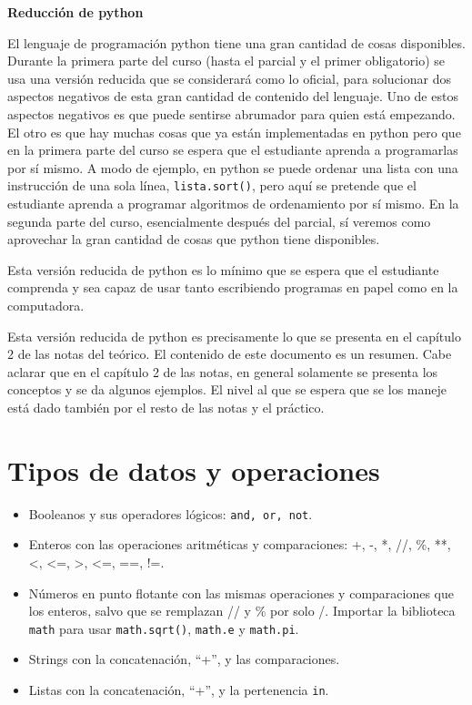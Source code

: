 \documentclass[a4paper, 12pt]{article}
\theoremstyle{definition}
\begin{document}
\centerline{\Huge\bf Reducción de python}

\vspace{2em}

El lenguaje de programación python tiene una gran cantidad de cosas disponibles. Durante la primera parte del curso (hasta el parcial y el primer obligatorio) se usa una versión reducida que se considerará como lo oficial, para solucionar dos aspectos negativos de esta gran cantidad de contenido del lenguaje. Uno de estos aspectos negativos es que puede sentirse abrumador para quien está empezando. El otro es que hay muchas cosas que ya están implementadas en python pero que en la primera parte del curso se espera que el estudiante aprenda a programarlas por sí mismo. A modo de ejemplo, en python se puede ordenar una lista con una instrucción de una sola línea, {\tt lista.sort()}, pero aquí se pretende que el estudiante aprenda a programar algoritmos de ordenamiento por sí mismo. En la segunda parte del curso, esencialmente después del parcial, sí veremos como aprovechar la gran cantidad de cosas que python tiene disponibles.

Esta versión reducida de python es lo mínimo que se espera que el estudiante comprenda y sea capaz de usar tanto escribiendo programas en papel como en la computadora.

Esta versión reducida de python es precisamente lo que se presenta en el capítulo 2 de las notas del teórico. El contenido de este documento es un resumen. Cabe aclarar que en el capítulo 2 de las notas, en general solamente se presenta los conceptos y se da algunos ejemplos. El nivel al que se espera que se los maneje está dado también por el resto de las notas y el práctico.


\section{Tipos de datos y operaciones}
\begin{itemize}
	\item Booleanos y sus operadores lógicos: {\tt and, or, not}.
	\item Enteros con las operaciones aritméticas y comparaciones:
	+, -, *, //, \%, **, <, <=, >, <=, ==, !=.
	\item Números en punto flotante con las mismas operaciones y comparaciones que los enteros, salvo que se remplazan // y \% por solo /. Importar la biblioteca {\tt math} para usar {\tt math.sqrt()}, {\tt math.e} y {\tt math.pi}.
	\item Strings con la concatenación, ``+'', y las comparaciones.
	\item Listas con la concatenación, ``+'', y la pertenencia {\tt in}.
\end{itemize}
\end{document}
